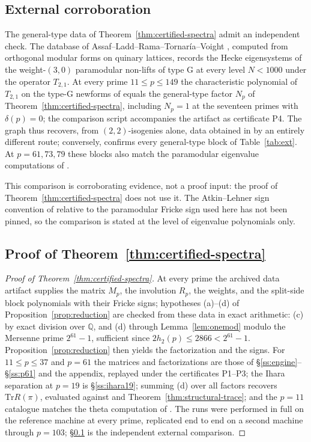 \documentclass[11pt]{amsart}
\theoremstyle{plain}
\theoremstyle{definition}
\newcommand{\Q}{\mathbb{Q}}
\newcommand{\Tr}{\mathrm{Tr}}
\begin{document}
	\subsection{External corroboration}
	\label{ss:external}
	
	The general-type data of Theorem~\ref{thm:certified-spectra} admit an
	independent check. The database of
	Assaf--Ladd--Rama--Tornar\'ia--Voight \cite{ALRTV}, computed from
	orthogonal modular forms on quinary lattices, records the Hecke
	eigensystems of the weight-$(3,0)$ paramodular non-lifts of type G at
	every level $N<1000$ under the operator $T_{2,1}$. At every prime
	$11\le p\le149$ the characteristic polynomial of $T_{2,1}$ on the type-G
	newforms of \cite{ALRTV} equals the general-type factor $N_p$ of
	Theorem~\ref{thm:certified-spectra}, including $N_p=1$ at the seventeen
	primes with $\delta(p)=0$; the comparison script accompanies the artifact
	as certificate P4. The graph thus recovers, from $(2,2)$-isogenies alone,
	data obtained in \cite{ALRTV} by an entirely different route; conversely,
	\cite{ALRTV} confirms every general-type block of Table~\ref{tab:ext}. At
	$p=61,73,79$ these blocks also match the paramodular eigenvalue
	computations of \cite{PSY2024}.
	
	This comparison is corroborating evidence, not a proof input: the proof of
	Theorem~\ref{thm:certified-spectra} does not use it. The Atkin--Lehner
	sign convention of \cite{ALRTV} relative to the paramodular Fricke sign
	used here has not been pinned, so the comparison is stated at the level of
	eigenvalue polynomials only.
	
	\subsection{Proof of Theorem~\ref{thm:certified-spectra}}
	\label{ss:proof-certified}
	
	\begin{proof}[Proof of Theorem~\ref{thm:certified-spectra}]
		At every prime the archived data artifact supplies the matrix $M_p$, the
		involution $R_p$, the weights, and the split-side block polynomials with
		their Fricke signs; hypotheses \textup{(a)}--\textup{(d)} of
		Proposition~\ref{prop:reduction} are checked from these data in exact
		arithmetic: \textup{(c)} by exact division over $\Q$, and
		\textup{(d)} through Lemma~\ref{lem:onemod} modulo the Mersenne prime
		$2^{61}-1$, sufficient since $2h_2(p)\le2866<2^{61}-1$.
		Proposition~\ref{prop:reduction} then yields the factorization and the
		signs. For $11\le p\le37$ and $p=61$ the matrices and factorizations are
		those of \S\ref{ss:engine}--\S\ref{ss:p61} and the appendix, replayed
		under the certificates P1--P3; the Ihara separation at $p=19$ is
		\S\ref{ss:ihara19}; summing \textup{(d)} over all factors recovers
		$\Tr R(\pi)$, evaluated against \cite[Thm.~2]{IbukiyamaKatsura} and
		Theorem~\ref{thm:structural-trace}; and the $p=11$ catalogue matches the
		theta computation of \cite[\S4]{Ibukiyama2018conj}. The runs were
		performed in full on the reference machine at every prime, replicated end
		to end on a second machine through $p=103$; \S\ref{ss:external} is the
		independent external comparison.
	\end{proof}
	
\end{document}
